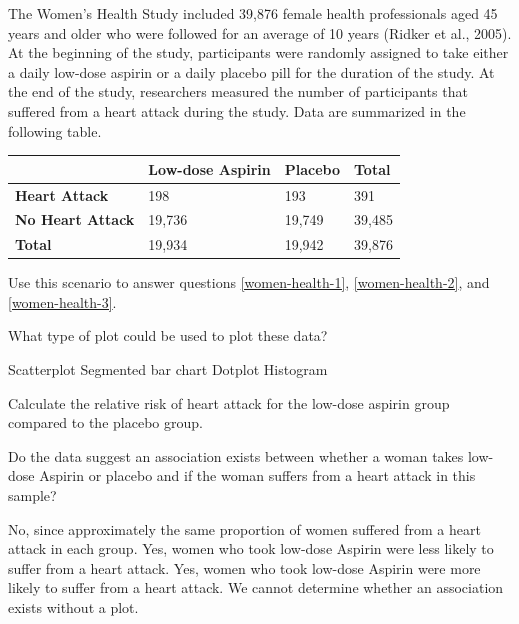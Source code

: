 \documentclass{article}
\begin{document}
\begin{mcquestions}
		\begin{mcquestioninstruction}
			The Women's Health Study included 39,876 female health professionals aged 45 years and older who were followed for an average of 10 years (Ridker et al., 2005). At the beginning of the study, participants were randomly assigned to take either a daily low-dose aspirin or a daily placebo pill for the duration of the study. At the end of the study, researchers measured the number of participants that suffered from a heart attack during the study. Data are summarized in the following table.
			\begin{center}
				\begin{tabular}{| l | l | l | l |}
					\hline
					& \textbf{Low-dose Aspirin} & \textbf{Placebo} & \textbf{Total} \\
					\hline
					\textbf{Heart Attack} & 198 & 193 & 391 \\
					\hline
					\textbf{No Heart Attack} & 19,736 & 19,749 & 39,485 \\
					\hline
					\textbf{Total} & 19,934 & 19,942 & 39,876 \\
					\hline
				\end{tabular}
			\end{center}
			Use this scenario to answer questions \ref{women-health-1}, \ref{women-health-2}, and \ref{women-health-3}.
		\end{mcquestioninstruction}
		\question What type of plot could be used to plot these data? \label{women-health-1}
		\begin{mcanswerslist}
			\answer Scatterplot
			\answer[correct] Segmented bar chart
			\answer Dotplot
			\answer Histogram
		\end{mcanswerslist}
		
		\question[follow] Calculate the relative risk of heart attack for the low-dose aspirin group compared to the placebo group. \label{women-health-2}
		\begin{mcanswerslist}
			\answer[correct] 1.026
			\answer 0.974
			\answer 0.00993
			\answer 0.000255
		\end{mcanswerslist}
		
		\question[follow] Do the data suggest an association exists between whether a woman takes low-dose Aspirin or placebo and if the woman suffers from a heart attack in this sample? \label{women-health-3}
		\begin{mcanswerslist}
			\answer[correct] No, since approximately the same proportion of women suffered from a heart attack in each group.
			\answer Yes, women who took low-dose Aspirin were less likely to suffer from a heart attack.
			\answer Yes, women who took low-dose Aspirin were more likely to suffer from a heart attack.
			\answer We cannot determine whether an association exists without a plot.
		\end{mcanswerslist}
		
	\end{mcquestions}
\end{document}
